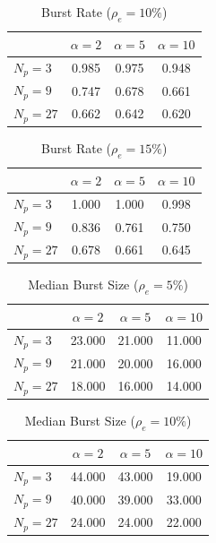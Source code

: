 \begin{table}[htbp]
\centering
\begin{tabular}{lccc}
\toprule
 & $\alpha=2$ & $\alpha=5$ & $\alpha=10$ \\
\midrule
$N_p=3$ & 0.985 & 0.975 & 0.948 \\
$N_p=9$ & 0.747 & 0.678 & 0.661 \\
$N_p=27$ & 0.662 & 0.642 & 0.620 \\
\bottomrule
\end{tabular}
\caption{Burst Rate ($\rho_e=10\%$)}
\label{tab:exp2_burst_rate_rho10}
\end{table}


\begin{table}[htbp]
\centering
\begin{tabular}{lccc}
\toprule
 & $\alpha=2$ & $\alpha=5$ & $\alpha=10$ \\
\midrule
$N_p=3$ & 1.000 & 1.000 & 0.998 \\
$N_p=9$ & 0.836 & 0.761 & 0.750 \\
$N_p=27$ & 0.678 & 0.661 & 0.645 \\
\bottomrule
\end{tabular}
\caption{Burst Rate ($\rho_e=15\%$)}
\label{tab:exp2_burst_rate_rho15}
\end{table}


\begin{table}[htbp]
\centering
\begin{tabular}{lccc}
\toprule
 & $\alpha=2$ & $\alpha=5$ & $\alpha=10$ \\
\midrule
$N_p=3$ & 23.000 & 21.000 & 11.000 \\
$N_p=9$ & 21.000 & 20.000 & 16.000 \\
$N_p=27$ & 18.000 & 16.000 & 14.000 \\
\bottomrule
\end{tabular}
\caption{Median Burst Size ($\rho_e=5\%$)}
\label{tab:exp2_burst_size_median_rho5}
\end{table}


\begin{table}[htbp]
\centering
\begin{tabular}{lccc}
\toprule
 & $\alpha=2$ & $\alpha=5$ & $\alpha=10$ \\
\midrule
$N_p=3$ & 44.000 & 43.000 & 19.000 \\
$N_p=9$ & 40.000 & 39.000 & 33.000 \\
$N_p=27$ & 24.000 & 24.000 & 22.000 \\
\bottomrule
\end{tabular}
\caption{Median Burst Size ($\rho_e=10\%$)}
\label{tab:exp2_burst_size_median_rho10}
\end{table}


